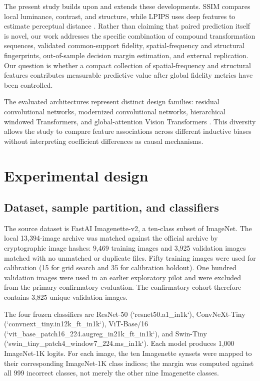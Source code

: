 \documentclass[10pt,twocolumn]{article}
\begin{document}
The present study builds upon and extends these developments. SSIM compares local luminance, contrast, and structure, while LPIPS uses deep features to estimate perceptual distance \cite{wang2004,zhang2018}. Rather than claiming that paired prediction itself is novel, our work addresses the specific combination of compound transformation sequences, validated common-support fidelity, spatial-frequency and structural fingerprints, out-of-sample decision margin estimation, and external replication. Our question is whether a compact collection of spatial-frequency and structural features contributes measurable predictive value after global fidelity metrics have been controlled.

The evaluated architectures represent distinct design families: residual convolutional networks, modernized convolutional networks, hierarchical windowed Transformers, and global-attention Vision Transformers \cite{he2016,liu2022convnext,liu2021swin,dosovitskiy2021}. This diversity allows the study to compare feature associations across different inductive biases without interpreting coefficient differences as causal mechanisms.

\section{Experimental design}

\subsection{Dataset, sample partition, and classifiers}

The source dataset is FastAI Imagenette-v2, a ten-class subset of ImageNet. The local 13,394-image archive was matched against the official archive by cryptographic image hashes: 9,469 training images and 3,925 validation images matched with no unmatched or duplicate files. Fifty training images were used for calibration (15 for grid search and 35 for calibration holdout). One hundred validation images were used in an earlier exploratory pilot and were excluded from the primary confirmatory evaluation. The confirmatory cohort therefore contains 3,825 unique validation images.

The four frozen classifiers are ResNet-50 (`resnet50.a1\_in1k`), ConvNeXt-Tiny (`convnext\_tiny.in12k\_ft\_in1k`), ViT-Base/16 (`vit\_base\_patch16\_224.augreg\_in21k\_ft\_in1k`), and Swin-Tiny (`swin\_tiny\_patch4\_window7\_224.ms\_in1k`). Each model produces 1,000 ImageNet-1K logits. For each image, the ten Imagenette synsets were mapped to their corresponding ImageNet-1K class indices; the margin was computed against all 999 incorrect classes, not merely the other nine Imagenette classes.
\end{document}
